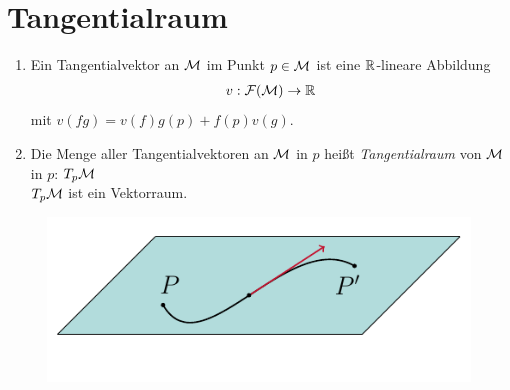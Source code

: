 \section{Tangentialraum} 


\begin{defs}
\begin{enumerate}
\item Ein Tangentialvektor an $\mathcal{M}$ im Punkt $p \in \mathcal{M}$ ist eine $\mathbb{R}$-lineare Abbildung
\begin{align*}
v: \mathcal{F}(\mathcal{M}) \rightarrow \mathbb{R}
\end{align*}
mit $v(fg) = v(f)g(p) + f(p)v(g)$.
\item Die Menge aller Tangentialvektoren an $\mathcal{M}$ in $p$ heißt \textit{Tangentialraum} von $\mathcal{M}$ in $p$: $T_p \mathcal{M}$\\
$T_p \mathcal{M}$ ist ein Vektorraum.
\end{enumerate}

\begin{figure}[H]
\centering
\includegraphics[scale=1]{figures/tikz/tangentline.pdf}
\end{figure}

\end{defs}
